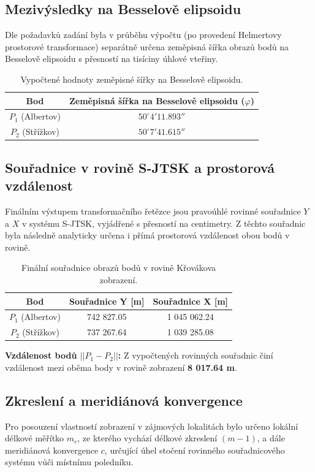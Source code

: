 \documentclass[12pt, a4paper]{article}
\begin{document}
\subsection{Mezivýsledky na Besselově elipsoidu}
Dle požadavků zadání byla v průběhu výpočtu (po provedení Helmertovy prostorové transformace) separátně určena zeměpisná šířka obrazů bodů na Besselově elipsoidu s přesností na tisíciny úhlové vteřiny.

\begin{table}[h!]
\centering
\begin{tabular}{|c|c|}
\hline
\textbf{Bod} & \textbf{Zeměpisná šířka na Besselově elipsoidu ($\varphi$)} \\ \hline
$P_1$ (Albertov) & $50^\circ 4' 11.893''$ \\ \hline
$P_2$ (Střížkov) & $50^\circ 7' 41.615''$ \\ \hline
\end{tabular}
\caption{Vypočtené hodnoty zeměpisné šířky na Besselově elipsoidu.}
\label{tab:phi_bessel}
\end{table}

\subsection{Souřadnice v rovině S-JTSK a prostorová vzdálenost}
Finálním výstupem transformačního řetězce jsou pravoúhlé rovinné souřadnice $Y$ a $X$ v systému S-JTSK, vyjádřené s přesností na centimetry. Z těchto souřadnic byla následně analyticky určena i přímá prostorová vzdálenost obou bodů v rovině.

\begin{table}[h!]
\centering
\begin{tabular}{|c|c|c|}
\hline
\textbf{Bod} & \textbf{Souřadnice Y [m]} & \textbf{Souřadnice X [m]} \\ \hline
$P_1$ (Albertov) & 742 827.05 & 1 045 062.24 \\ \hline
$P_2$ (Střížkov) & 737 267.64 & 1 039 285.08 \\ \hline
\end{tabular}
\caption{Finální souřadnice obrazů bodů v rovině Křovákova zobrazení.}
\label{tab:souradnice_jtsk}
\end{table}

\noindent \textbf{Vzdálenost bodů $||P_1 - P_2||$:} Z vypočtených rovinných souřadnic činí vzdálenost mezi oběma body v rovině zobrazení \textbf{8 017.64 m}.

\subsection{Zkreslení a meridiánová konvergence}
Pro posouzení vlastností zobrazení v zájmových lokalitách bylo určeno lokální délkové měřítko $m_r$, ze kterého vychází délkové zkreslení $(m-1)$, a dále meridiánová konvergence $c$, určující úhel stočení rovinného souřadnicového systému vůči místnímu poledníku.
\end{document}
